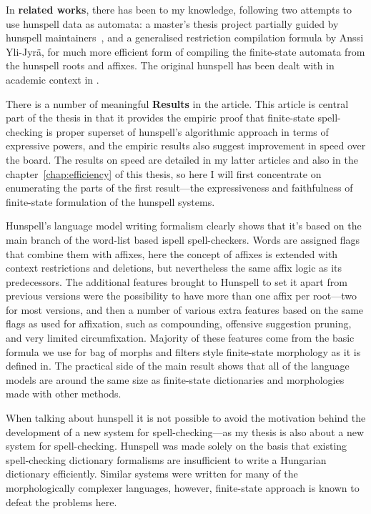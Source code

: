 \documentclass[officiallayout,draft]{unihelcompling}
\begin{document}
In \textbf{related works}, there has been to my knowledge, following two
attempts to use hunspell data as automata: a master's thesis project partially
guided by hunspell maintainers~\cite{greenfield2010open}, and a generalised
restriction compilation formula by Anssi Yli-Jyrä, for much more efficient form
of compiling the finite-state automata from the hunspell roots and affixes. The
original hunspell has been dealt with in academic context in
\cite{tron2005hunmorph}.

There is a number of meaningful \textbf{Results} in the article. This article
is central part of the thesis in that it provides the empiric proof that
finite-state spell-checking is proper superset of hunspell's algorithmic 
approach in terms of expressive powers, and the empiric results also suggest
improvement in speed over the board. The results on speed are detailed in my
latter articles and also in the chapter~\ref{chap:efficiency} of this thesis,
so here I will first concentrate on enumerating the parts of the first
result---the expressiveness and faithfulness of finite-state formulation of
the hunspell systems.

Hunspell's language model writing formalism clearly shows that it's based on
the main branch of the word-list based ispell spell-checkers. Words are
assigned flags that combine them with affixes, here the concept of affixes is
extended with context restrictions and deletions, but nevertheless the same
affix logic as its predecessors. The additional features brought to Hunspell to
set it apart from previous versions were the possibility to have more than one
affix per root---two for most versions, and then a number of various extra
features based on the same flags as used for affixation, such as compounding,
offensive suggestion pruning, and very limited circumfixation.  Majority of
these features come from the basic formula we use for bag of morphs and filters
style finite-state morphology as it is defined in\cite{linden2009hfst}. The
practical side of the main result shows that all of the language models are
around the same size as finite-state dictionaries and morphologies made with
other methods.

When talking about hunspell it is not possible to avoid the motivation behind
the development of a new system for spell-checking---as my thesis is also about
a new system for spell-checking. Hunspell was made solely on the basis that
existing spell-checking dictionary formalisms are insufficient to write a
Hungarian dictionary efficiently. Similar systems were written for many of the
morphologically complexer languages, however, finite-state approach is known
to defeat the problems here.
\end{document}
